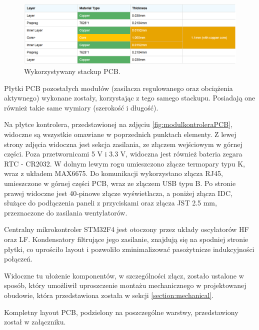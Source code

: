 \begin{figure}[h!]
    \begin{center}
        \includegraphics[width = 17cm]{images/stackupPCB.png}
        \caption{Wykorzystywany stackup PCB.} 
        \label{fig:stackupPCB}
    \end{center}
\end{figure}

Płytki PCB pozostałych modułów (zasilacza regulowanego oraz obciążenia aktywnego) wykonane zostały,
korzystając z tego samego stackupu. Posiadają one również takie same wymiary (szerokość i długość).


Na płytce kontrolera, przedstawionej na zdjęciu \ref{fig:modulkontroleraPCB}, widoczne są wszystkie omawiane 
w poprzednich punktach elementy. Z lewej strony zdjęcia widoczna jest sekcja zasilania, ze złączem wejściowym w 
górnej części. Poza przetwornicami 5 V i 3.3 V, widoczna jest również bateria zegara RTC - CR2032.
W dolnym lewym rogu umieszczono złącze termopary typu K, wraz z układem MAX6675. 
Do komunikacji wykorzystano złącza RJ45, umieszczone w górnej części PCB, wraz ze złączem USB typu B. 
Po stronie prawej widoczne jest 40-pinowe złącze wyświetlacza, a poniżej złącza IDC, służące do podłączenia 
paneli z przyciskami oraz złącza JST 2.5 mm, przeznaczone do zasilania wentylatorów.  

Centralny mikrokontroler STM32F4 jest otoczony przez układy oscylatorów HF oraz LF. Kondensatory filtrujące 
jego zasilanie, znajdują się na spodniej stronie płytki, co uprościło layout i pozwoliło zminimalizować 
pasożytnicze indukcyjności połączeń.

Widoczne tu ułożenie komponentów, w szczególności złącz, zostało ustalone w sposób, który umożliwił uproszczenie montażu mechanicznego
 w projektowanej obudowie, która przedstawiona została w sekcji \ref{section:mechanical}. 

Kompletny layout PCB, podzielony na poszczególne warstwy, przedstawiony został w załączniku.







